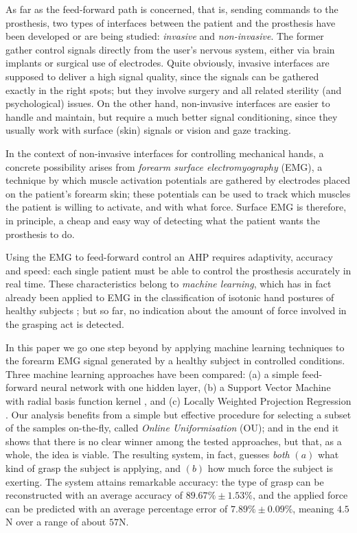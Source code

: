 As far as the feed-forward path is concerned, that is, sending
commands to the prosthesis, two types of interfaces between the
patient and the prosthesis have been developed or are being studied:
\emph{invasive} and \emph{non-invasive}. The former gather control
signals directly from the user's nervous system, either via brain
implants or surgical use of electrodes. Quite obviously, invasive
interfaces are supposed to deliver a high signal quality, since the
signals can be gathered exactly in the right spots; but they involve
surgery and all related sterility (and psychological) issues. On the
other hand, non-invasive interfaces are easier to handle and maintain,
but require a much better signal conditioning, since they usually work
with surface (skin) signals or vision and gaze tracking.

In the context of non-invasive interfaces for controlling mechanical
hands, a concrete possibility arises from \emph{forearm surface
electromyography} (EMG), a technique by which muscle activation
potentials are gathered by electrodes placed on the patient's forearm
skin; these potentials can be used to track which muscles the patient
is willing to activate, and with what force. Surface EMG is therefore,
in principle, a cheap and easy way of detecting what the patient wants
the prosthesis to do.

Using the EMG to feed-forward control an AHP requires adaptivity,
accuracy and speed: each single patient must be able to control the
prosthesis accurately in real time. These characteristics belong to
\emph{machine learning}, which has in fact already been applied to EMG
in the classification of isotonic hand postures of healthy subjects
\cite{ekvall,smagt}; but so far, no indication about the amount of
force involved in the grasping act is detected.

In this paper we go one step beyond by applying machine learning
techniques to the forearm EMG signal generated by a healthy subject in
controlled conditions. Three machine learning approaches have been compared:
(a) a simple feed-forward neural network with one hidden layer,
(b) a Support Vector Machine with radial basis function kernel
\cite{BGV92}, and (c) Locally Weighted Projection Regression
\cite{lwpr}. Our analysis benefits from a simple but effective procedure
for selecting a subset of the samples on-the-fly, called \emph{Online
Uniformisation} (OU); and in the end it shows that there is no clear
winner among the tested approaches, but that, as a whole, the idea is
viable. The resulting system, in fact, guesses \emph{both} $(a)$ what
kind of grasp the subject is applying, and $(b)$ how much force the
subject is exerting. The system attains remarkable accuracy: the type
of grasp can be reconstructed with an average accuracy of $89.67\% \pm
1.53\%$, and the applied force can be predicted with an average
percentage error of $7.89\% \pm 0.09\%$, meaning $4.5$N over a range
of about $57$N.

